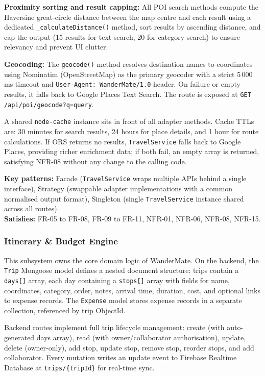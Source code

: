 \documentclass[12pt, a4paper]{article}
\begin{document}
\textbf{Proximity sorting and result capping:} All POI search methods compute the Haversine great-circle distance between the map centre and each result using a dedicated \texttt{\_calculateDistance()} method, sort results by ascending distance, and cap the output (15 results for text search, 20 for category search) to ensure relevancy and prevent UI clutter.

\textbf{Geocoding:} The \texttt{geocode()} method resolves destination names to coordinates using Nominatim (OpenStreetMap) as the primary geocoder with a strict 5\,000\,ms timeout and \texttt{User-Agent: WanderMate/1.0} header. On failure or empty results, it falls back to Google Places Text Search. The route is exposed at \texttt{GET /api/poi/geocode?q=query}.

A shared \texttt{node-cache} instance sits in front of all adapter methods. Cache TTLs are: 30 minutes for search results, 24 hours for place details, and 1 hour for route calculations. If ORS returns no results, \texttt{TravelService} falls back to Google Places, providing richer enrichment data; if both fail, an empty array is returned, satisfying NFR-08 without any change to the calling code.

\begin{tcolorbox}[notebox]
  \textbf{Key patterns:} Facade (\texttt{TravelService} wraps multiple APIs behind a single interface), Strategy (swappable adapter implementations with a common normalised output format), Singleton (single \texttt{TravelService} instance shared across all routes).\\[2pt]
  \textbf{Satisfies:} FR-05 to FR-08, FR-09 to FR-11, NFR-01, NFR-06, NFR-08, NFR-15.
\end{tcolorbox}

\subsubsection{Itinerary \& Budget Engine}

This subsystem owns the core domain logic of WanderMate. On the backend, the \texttt{Trip} Mongoose model defines a nested document structure: trips contain a \texttt{days[]} array, each day containing a \texttt{stops[]} array with fields for name, coordinates, category, order, notes, arrival time, duration, cost, and optional links to expense records. The \texttt{Expense} model stores expense records in a separate collection, referenced by trip ObjectId.

Backend routes implement full trip lifecycle management: create (with auto-generated days array), read (with owner/collaborator authorisation), update, delete (owner-only), add stop, update stop, remove stop, reorder stops, and add collaborator. Every mutation writes an update event to Firebase Realtime Database at \texttt{trips/\{tripId\}} for real-time sync.
\end{document}
